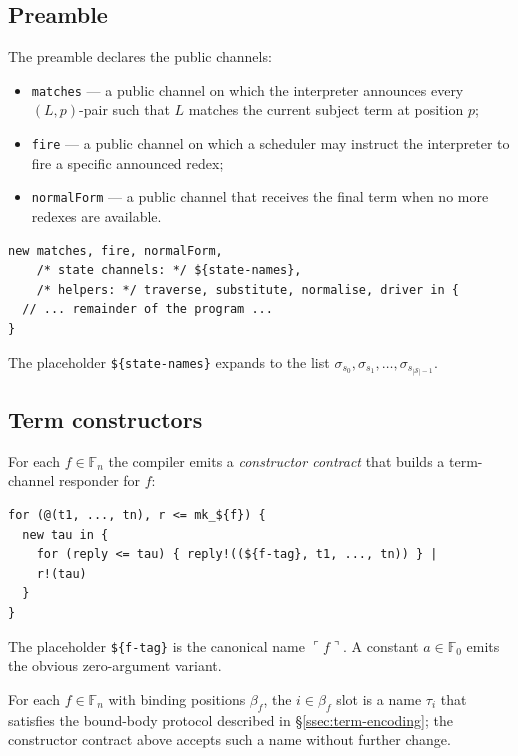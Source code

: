 \documentclass[11pt]{article}
\theoremstyle{plain}
\theoremstyle{definition}
\theoremstyle{remark}
\newcommand{\reflect}[1]{\ulcorner #1 \urcorner}
\newcommand{\States}{\mathcal{S}}
\begin{document}
\subsection{Preamble}\label{ssec:emit-preamble}

The preamble declares the public channels:
\begin{itemize}[leftmargin=*]
  \item \texttt{matches} --- a public channel on which the interpreter
        announces every $(L, p)$-pair such that $L$ matches the current
        subject term at position $p$;
  \item \texttt{fire} --- a public channel on which a scheduler may
        instruct the interpreter to fire a specific announced redex;
  \item \texttt{normalForm} --- a public channel that receives the final
        term when no more redexes are available.
\end{itemize}
\begin{lstlisting}
new matches, fire, normalForm,
    /* state channels: */ ${state-names},
    /* helpers: */ traverse, substitute, normalise, driver in {
  // ... remainder of the program ...
}
\end{lstlisting}
The placeholder \texttt{\$\{state-names\}} expands to the list
$\sigma_{s_0}, \sigma_{s_1}, \ldots, \sigma_{s_{|\States|-1}}$.

\subsection{Term constructors}\label{ssec:emit-constructors}

For each $f \in \mathbb{F}_n$ the compiler emits a \emph{constructor
contract} that builds a term-channel responder for $f$:
\begin{lstlisting}
for (@(t1, ..., tn), r <= mk_${f}) {
  new tau in {
    for (reply <= tau) { reply!((${f-tag}, t1, ..., tn)) } |
    r!(tau)
  }
}
\end{lstlisting}
The placeholder \texttt{\$\{f-tag\}} is the canonical name $\reflect{f}$.
A constant $a \in \mathbb{F}_0$ emits the obvious zero-argument variant.

For each $f \in \mathbb{F}_n$ with binding positions $\beta_f$, the
$i \in \beta_f$ slot is a name $\tau_i$ that satisfies the bound-body
protocol described in \S\ref{ssec:term-encoding}; the constructor contract
above accepts such a name without further change.
\end{document}
